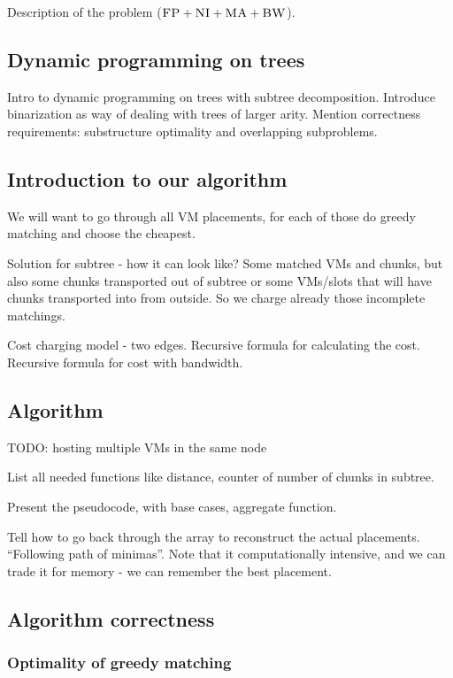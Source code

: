 Description of the problem ($\textsc{FP}+\textsc{NI}+\textsc{MA}+\textsc{BW}$).

\subsection{Dynamic programming on trees}

Intro to dynamic programming on trees with subtree decomposition.
Introduce binarization as way of dealing with trees of larger arity.
Mention correctness requirements: substructure optimality and overlapping subproblems.

\subsection{Introduction to our algorithm}

We will want to go through all VM placements, for each of those do greedy matching and choose the cheapest.

Solution for subtree - how it can look like? Some matched VMs and chunks, but also some chunks transported out of subtree or some VMs/slots that will have chunks transported into from outside. So we charge already those incomplete matchings.

Cost charging model - two edges. Recursive formula for calculating the cost.
Recursive formula for cost with bandwidth. 

\subsection{Algorithm}

TODO: hosting multiple VMs in the same node

List all needed functions like distance, counter of number of chunks in subtree.

Present the pseudocode, with base cases, aggregate function.

Tell how to go back through the array to reconstruct the actual placements. ``Following path of minimas''.
Note that it computationally intensive, and we can trade it for memory - we can remember the best placement.

\subsection{Algorithm correctness}
\subsubsection{Optimality of greedy matching}

